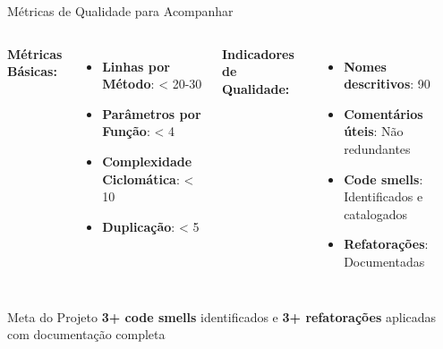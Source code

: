 \documentclass[10pt]{beamer}
\begin{document}
\begin{frame}{Métricas de Qualidade para Acompanhar}
\begin{columns}[c]
\textbf{Métricas Básicas:}
\begin{itemize}
    \item \textbf{Linhas por Método}: < 20-30
    \item \textbf{Parâmetros por Função}: < 4
    \item \textbf{Complexidade Ciclomática}: < 10
    \item \textbf{Duplicação}: < 5%
\end{itemize}

\textbf{Indicadores de Qualidade:}
\begin{itemize}
    \item \textbf{Nomes descritivos}: 90%
    \item \textbf{Comentários úteis}: Não redundantes
    \item \textbf{Code smells}: Identificados e catalogados
    \item \textbf{Refatorações}: Documentadas
\end{itemize}
\end{columns}

\vspace{0.5cm}
\begin{exampleblock}{Meta do Projeto}
\textbf{3+ code smells} identificados e \textbf{3+ refatorações} aplicadas com documentação completa
\end{exampleblock}
\end{frame}
\end{document}
